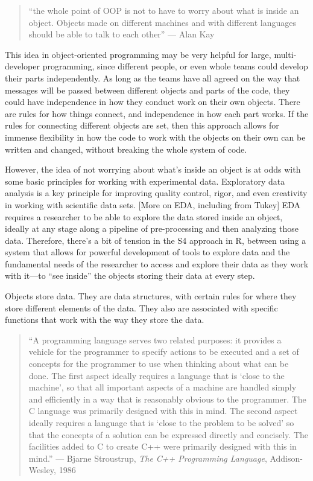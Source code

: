 \documentclass[]{tufte-book}
\begin{document}
\begin{quote}
``the whole point of OOP is not to have to worry about what is inside an object.
Objects made on different machines and with different languages should be able to talk to each other''
--- Alan Kay
\end{quote}

This idea in object-oriented programming may be very helpful for large,
multi-developer programming, since different people, or even whole teams could
develop their parts independently. As long as the teams have all agreed on
the way that messages will be passed between different objects and parts of the
code, they could have independence in how they conduct work on their own
objects. There are rules for how things connect, and independence in how
each part works. If the rules for connecting different objects are set, then
this approach allows for immense flexibility in how the code to work with the
objects on their own can be written and changed, without breaking the whole
system of code.

However, the idea of not worrying about what's inside an object is at odds with
some basic principles for working with experimental data. Exploratory data
analysis is a key principle for improving quality control, rigor, and even
creativity in working with scientific data sets. {[}More on EDA, including from
Tukey{]} EDA requires a researcher to be able to explore the data stored inside
an object, ideally at any stage along a pipeline of pre-processing and then
analyzing those data. Therefore, there's a bit of tension in the S4 approach in
R, between using a system that allows for powerful development of tools to
explore data and the fundamental needs of the researcher to access and explore
their data as they work with it---to ``see inside'' the objects storing their
data at every step.

Objects store data. They are data structures, with certain rules for where they
store different elements of the data. They also are associated with specific
functions that work with the way they store the data.

\begin{quote}
``A programming language serves two related purposes: it provides a vehicle for the programmer to specify actions to be executed and a set of concepts for the programmer to use when thinking about what can be done. The first aspect ideally requires a language that is `close to the machine', so that all important aspects of a machine are handled simply and efficiently in a way that is reasonably obvious to the programmer. The C language was primarily designed with this in mind. The second aspect ideally requires a language that is `close to the problem to be solved' so that the concepts of a solution can be expressed directly and concisely. The facilities added to C to create C++ were primarily designed with this in mind.''
--- Bjarne Stroustrup, \emph{The C++ Programming Language}, Addison-Wesley, 1986
\end{quote}
\end{document}
